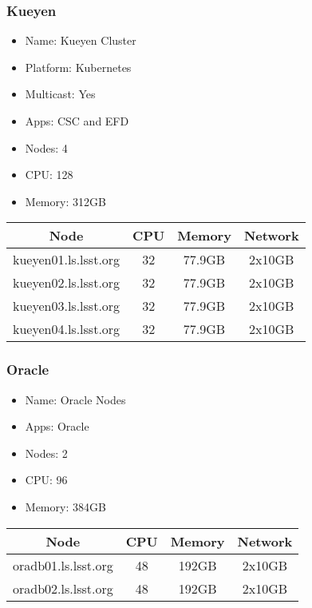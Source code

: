 \newpage
\subsubsection{Kueyen}
\begin{itemize}
  \itemsep0em 
  \item Name:      Kueyen Cluster
  \item Platform:  Kubernetes
  \item Multicast: Yes
  \item Apps:      CSC and EFD
  \item Nodes:     4
  \item CPU:       128
  \item Memory:    312GB
\end{itemize}
\begin{center}
  \small
  \begin{tabular}{||c c c c||}
    \hline
    Node & CPU & Memory & Network \\ [0.5ex]
    \hline
    kueyen01.ls.lsst.org & 32 & 77.9GB & 2x10GB \\
    \hline
    kueyen02.ls.lsst.org & 32 & 77.9GB & 2x10GB \\
    \hline
    kueyen03.ls.lsst.org & 32 & 77.9GB & 2x10GB \\
    \hline
    kueyen04.ls.lsst.org & 32 & 77.9GB & 2x10GB \\
    \hline
  \end{tabular}
\end{center}

\subsubsection{Oracle}
\begin{itemize}
  \itemsep0em 
  \item Name:      Oracle Nodes
  \item Apps:      Oracle
  \item Nodes:     2
  \item CPU:       96
  \item Memory:    384GB
\end{itemize}
\begin{center}
  \small
  \begin{tabular}{||c c c c||} 
    \hline
    Node & CPU & Memory & Network \\ [0.5ex] 
    \hline
    oradb01.ls.lsst.org & 48 & 192GB & 2x10GB \\
    \hline
    oradb02.ls.lsst.org & 48 & 192GB & 2x10GB \\
    \hline
  \end{tabular}
\end{center}

